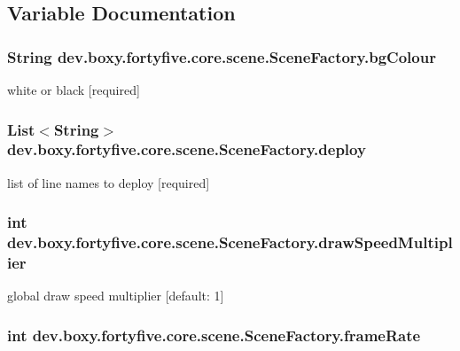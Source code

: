 \subsection{Variable Documentation}
\hypertarget{group__scene_gaba03aa65939f5ac2c4bfac931088a26e}{
\subsubsection[{bgColour}]{\setlength{\rightskip}{0pt plus 5cm}String {\bf dev.boxy.fortyfive.core.scene.SceneFactory.bgColour}}}
\label{db/dac/group__scene_gaba03aa65939f5ac2c4bfac931088a26e}
white or black \mbox{[}required\mbox{]} \hypertarget{group__scene_ga4dd990306b73a11f8919577de81612c0}{
\subsubsection[{deploy}]{\setlength{\rightskip}{0pt plus 5cm}List$<$String$>$ {\bf dev.boxy.fortyfive.core.scene.SceneFactory.deploy}}}
\label{db/dac/group__scene_ga4dd990306b73a11f8919577de81612c0}
list of line names to deploy \mbox{[}required\mbox{]} \hypertarget{group__scene_ga1842bb351dbdbb9eab2700adb61ac322}{
\subsubsection[{drawSpeedMultiplier}]{\setlength{\rightskip}{0pt plus 5cm}int {\bf dev.boxy.fortyfive.core.scene.SceneFactory.drawSpeedMultiplier}}}
\label{db/dac/group__scene_ga1842bb351dbdbb9eab2700adb61ac322}
global draw speed multiplier \mbox{[}default: 1\mbox{]} \hypertarget{group__scene_ga8d80f585cc4c2089e31b55e12085fcbd}{
\subsubsection[{frameRate}]{\setlength{\rightskip}{0pt plus 5cm}int {\bf dev.boxy.fortyfive.core.scene.SceneFactory.frameRate}}}
